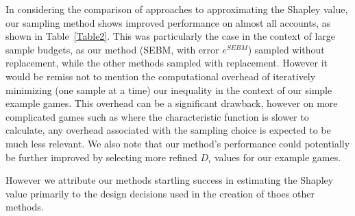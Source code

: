In considering the comparison of approaches to approximating the Shapley value, our sampling method shows improved performance on almost all accounts, as shown in Table~\ref{Table2}.
This was particularly the case in the context of large sample budgets, as our method (SEBM, with error $e^{SEBM}$) sampled without replacement, while the other methods sampled with replacement. 
However it would be remiss not to mention the computational overhead of iteratively minimizing (one sample at a time) our inequality in the context of our simple example games. 
This overhead can be a significant drawback, however on more complicated games such as where the characteristic function is slower to calculate, any overhead associated with the sampling choice is expected to be much less relevant. 
We also note that our method's performance could potentially be further improved by selecting more refined $D_i$ values for our example games.

However we attribute our methods startling success in estimating the Shapley value primarily to the design decisions used in the creation of thoes other methods.

% 


%


